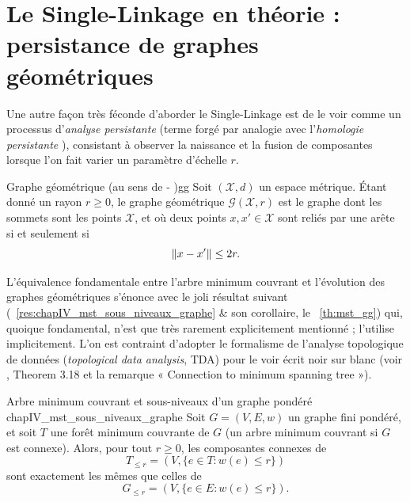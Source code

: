 \section{Le Single-Linkage en théorie : persistance de graphes géométriques}

Une autre façon très féconde d'aborder le Single-Linkage est de le voir comme un processus d'\emph{analyse persistante} (terme forgé par analogie avec l'\emph{homologie persistante} \cite{BobrowskiKahle}), consistant à observer la naissance et la fusion de composantes lorsque l'on fait varier un paramètre d'échelle $r$.

\begin{Definition}{Graphe géométrique (au sens de - \cite{Gilbert1961, penrose2003})}{gg}
Soit $(\mathcal X, d)$ un espace métrique. Étant donné un rayon $r \ge 0$, le graphe géométrique $\mathcal{G}(\mathcal{X}, r)$ est le graphe dont les sommets sont les points $\mathcal{X}$, et où deux points $x, x' \in \mathcal{X}$ sont reliés par une arête si et seulement si \[
\lVert x - x' \rVert \le 2r.
\]
\end{Definition}

L'équivalence fondamentale entre l'arbre minimum couvrant et l'évolution des graphes géométriques s'énonce avec le joli résultat suivant (\Res~\ref{res:chapIV_mst_sous_niveaux_graphe} \& son corollaire, le \Th~\ref{th:mst_gg}) qui, quoique fondamental, n'est que très rarement explicitement mentionné ;  \cite{penrose2003} l'utilise implicitement. 
L'on est contraint d'adopter le formalisme de l'analyse topologique de données (\emph{topological data analysis}, TDA) pour le voir écrit noir sur blanc (voir \cite{DeyWang2022}, Theorem 3.18 et la remarque « Connection to minimum spanning tree »).




\begin{Resultat}{Arbre minimum couvrant et sous-niveaux d'un graphe pondéré \cite{Kruskal1956, Prim1957}}{chapIV_mst_sous_niveaux_graphe}
Soit $G=(V,E,w)$ un graphe fini pondéré, et soit $T$ une forêt minimum couvrante de $G$ (un arbre minimum couvrant si $G$ est connexe). Alors, pour tout $r\ge0$, les composantes connexes de
\[
    T_{\le r}=(V,\{e\in T:w(e)\le r\})
\]
sont exactement les mêmes que celles de
\[
    G_{\le r}=(V,\{e\in E:w(e)\le r\}).
\]
\end{Resultat}

